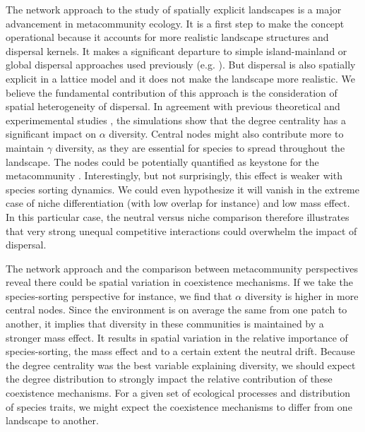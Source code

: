 \documentclass[12pt]{article}
\begin{document}
The network approach to the study of spatially explicit landscapes is a major
advancement in metacommunity ecology. It is a first step to make the concept
operational because it accounts for more realistic landscape structures and
dispersal kernels. It makes a significant departure to simple island-mainland or
global dispersal approaches used previously (e.g. \parencite{Tilman1994a,
Hubbell2001, Mouquet2002}). But dispersal is also spatially explicit in a
lattice model and it does not make the landscape more realistic. We believe the
fundamental contribution of this approach is the consideration of spatial
heterogeneity of dispersal. In agreement with previous theoretical
\parencite{Economo2011, Desjardins2012b} and experimemental studies
\parencite{Carrara2012}, the simulations show that the degree centrality has a
significant impact on $\alpha$ diversity. Central nodes might also contribute
more to maintain $\gamma$ diversity, as they are essential for species to spread
throughout the landscape. The nodes could be potentially quantified as keystone
for the metacommunity \parencite{Mouquet2013}. Interestingly, but not
surprisingly, this effect is weaker with species sorting dynamics. We could even
hypothesize it will vanish in the extreme case of niche differentiation (with
low overlap for instance) and low mass effect. In this particular case, the
neutral versus niche comparison therefore illustrates that very strong unequal
competitive interactions could overwhelm the impact of dispersal.

The network approach and the comparison between metacommunity perspectives
reveal there could be spatial variation in coexistence mechanisms. If we take
the species-sorting perspective for instance, we find that $\alpha$ diversity is
higher in more central nodes. Since the environment is on average the same from
one patch to another, it implies that diversity in these communities is
maintained by a stronger mass effect. It results in spatial variation in the
relative importance of species-sorting, the mass effect and to a certain extent
the neutral drift. Because the degree centrality was the best variable
explaining diversity, we should expect the degree distribution to strongly
impact the relative contribution of these coexistence mechanisms. For a given
set of ecological processes and distribution of species traits, we might expect
the coexistence mechanisms to differ from one landscape to another.
\end{document}
